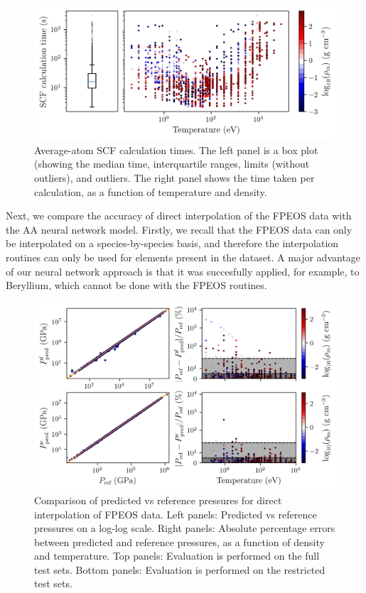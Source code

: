 \documentclass[%
 preprint,
 superscriptaddress,
 amsmath,amssymb,
longbibliography,
]{revtex4-2}
\begin{document}
\begin{figure}
    \centering
    \includegraphics{../figs/AA_timings.png}
    \caption{Average-atom SCF calculation times. The left panel is a box plot (showing the median time, interquartile ranges, limits (without outliers), and outliers. The right panel shows the time taken per calculation, as a function of temperature and density.}
    \label{fig:AA_timings}
\end{figure}

Next, we compare the accuracy of direct interpolation of the FPEOS data with the AA neural network model. Firstly, we recall that the FPEOS data can only be interpolated on a species-by-species basis, and therefore the interpolation routines can only be used for elements present in the dataset. A major advantage of our neural network approach is that it was succesfully applied, for example, to Beryllium, which cannot be done with the FPEOS routines.




\begin{figure}
    \centering
    \includegraphics{../figs/FPEOS_interp_plot.png}
    \caption{Comparison of predicted vs reference pressures for direct interpolation of FPEOS data. Left panels: Predicted vs reference pressures on a log-log scale. Right panels: Absolute percentage errors between predicted and reference pressures, as a function of density and temperature. Top panels: Evaluation is performed on the full test sets. Bottom panels: Evaluation is performed on the restricted test sets.}
    \label{fig:FPEOS_interp}
\end{figure}
\end{document}
